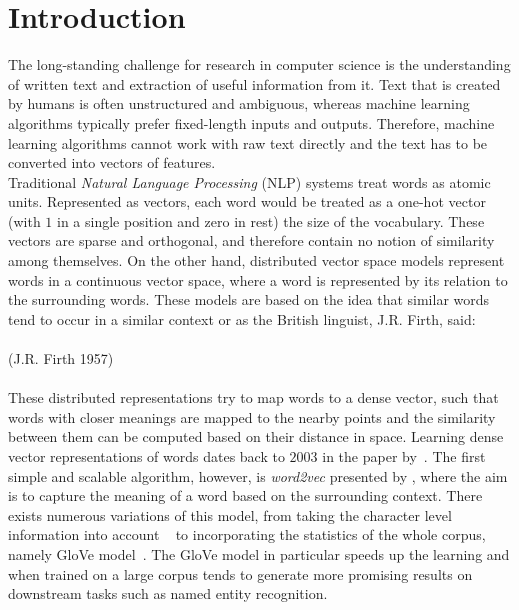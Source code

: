 \chapter{Introduction}\label{chap:intro}
The long-standing challenge for research in computer science is the understanding of written text and extraction of useful information from it. Text that is created by humans is often unstructured and ambiguous, whereas machine learning algorithms typically prefer fixed-length inputs and outputs. Therefore, machine learning algorithms cannot work with raw text directly and the text has to be converted into vectors of features.
\\
Traditional \emph{Natural Language Processing} (NLP) systems treat words as atomic units. Represented as vectors, each word would be treated as a one-hot vector (with $1$ in a single position and zero in rest) the size of the vocabulary. These vectors are sparse and orthogonal, and therefore contain no notion of similarity among themselves. On the other hand, distributed vector space models represent words in a continuous vector space, where a word is represented by its relation to the surrounding words. These models are based on the idea that similar words tend to occur in a similar context or as the British linguist, J.R. Firth, said:\\ \\
\noindent
{} (J.R. Firth 1957)\\
\\
These distributed representations try to map words to a dense vector, such that words with closer meanings are mapped to the nearby points and the similarity between them can be computed based on their distance in space.
Learning dense vector representations of words dates back to $2003$ in the paper by~. The first simple and scalable algorithm, however, is \emph{word2vec} presented by , where the aim is to capture the meaning of a word based on the surrounding context. There exists numerous variations of this model, from taking the character level information into account ~ to incorporating the statistics of the whole corpus, namely GloVe model~. The GloVe model in particular speeds up the learning and when trained on a large corpus tends to generate more promising results on downstream tasks such as named entity recognition.\\

